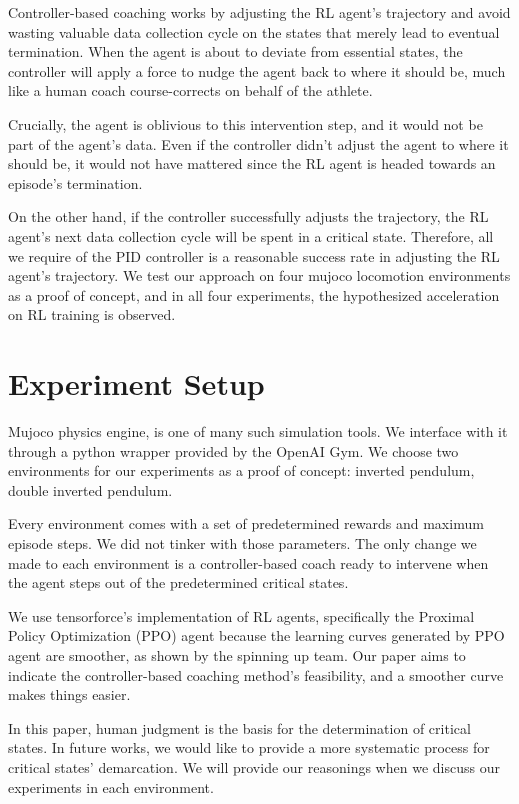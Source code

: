 \documentclass{IJCAS}
\begin{document}
Controller-based coaching works by adjusting the RL agent's trajectory and avoid wasting valuable data collection cycle on the states that merely lead to eventual termination. When the agent is about to deviate from essential states, the controller will apply a force to nudge the agent back to where it should be, much like a human coach course-corrects on behalf of the athlete. 

Crucially, the agent is oblivious to this intervention step, and it would not be part of the agent's data. Even if the controller didn't adjust the agent to where it should be, it would not have mattered since the RL agent is headed towards an episode's termination. 

On the other hand, if the controller successfully adjusts the trajectory, the RL agent's next data collection cycle will be spent in a critical state. Therefore, all we require of the PID controller is a reasonable success rate in adjusting the RL agent's trajectory. We test our approach on four mujoco locomotion environments as a proof of concept, and in all four experiments, the hypothesized acceleration on RL training is observed.

\section{Experiment Setup}
Mujoco physics engine\cite{6386109}, is one of many such simulation tools. We interface with it through a python wrapper provided by the OpenAI Gym\cite{Brockman2016OpenAIG}. We choose two environments for our experiments as a proof of concept: inverted pendulum, double inverted pendulum. 

Every environment comes with a set of predetermined rewards and maximum episode steps. We did not tinker with those parameters. The only change we made to each environment is a controller-based coach ready to intervene when the agent steps out of the predetermined critical states.

We use tensorforce's\cite{tensorforce} implementation of RL agents, specifically the Proximal Policy Optimization (PPO) agent because the learning curves generated by PPO agent are smoother, as shown by the spinning up\cite{SpinningUp2018} team. Our paper aims to indicate the controller-based coaching method's feasibility, and a smoother curve makes things easier. 

In this paper, human judgment is the basis for the determination of critical states. In future works, we would like to provide a more systematic process for critical states' demarcation. We will provide our reasonings when we discuss our experiments in each environment. 
\end{document}
